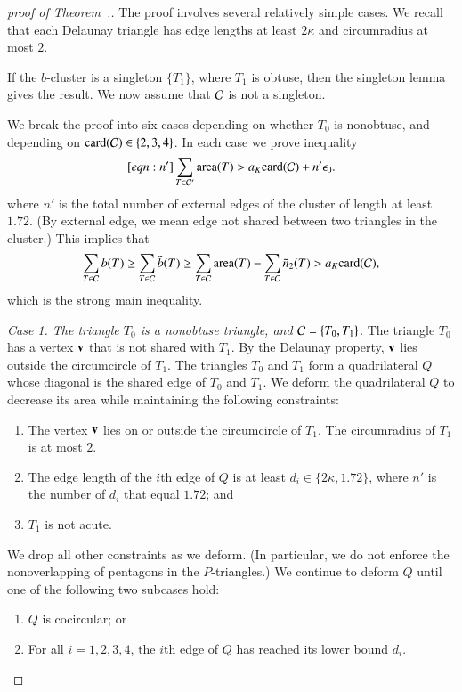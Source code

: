 \begin{proof}[proof of Theorem~.]
  The proof involves several relatively simple cases.  
  We recall that each Delaunay triangle has edge lengths at
  least $2\kappa$ and circumradius at most $2$.

  If the $b$-cluster is a singleton $\{T_1\}$, where $T_1$ is obtuse,
  then the singleton lemma gives the result.
  We now assume that $\mathcal C$ is not a singleton.


We break the proof into six cases depending on whether $T_0$ is
nonobtuse, and depending on ${\operatorname{card}}(\mathcal C)\in \{2,3,4\}$.
In each case we prove inequality 
\begin{equation}\libel{eqn:n'}
\sum_{T\in \C'} \area(T) > a_K \card(\C) + n'\epso.
\end{equation}
where $n'$ is the total number of external edges of the cluster of length at least $1.72$.
(By external edge, we mean edge not shared between two triangles in the cluster.)
This implies that
\[
\sum_{T\in\mathcal C} b(T) \ge \sum_{T\in\mathcal C} \tilde b(T) \ge \sum_{T\in\mathcal C}{\operatorname{area}}(T) - \sum_{T\in\mathcal C} \tilde n_2(T) > a_K {\operatorname{card}}(\mathcal C),
\]
which is the strong main inequality.

{\it Case 1. The triangle $T_0$ is a nonobtuse triangle, and
  $\mathcal C=\{T_0,T_1\}$.}  The triangle $T_0$ has a vertex ${\mathbf v}$ that is
not shared with $T_1$.  By the Delaunay property, ${\mathbf v}$ lies outside
the circumcircle of $T_1$.  The triangles $T_0$ and $T_1$ form a
quadrilateral $Q$ whose diagonal is the shared edge of $T_0$ and
$T_1$.  We deform the quadrilateral $Q$ to decrease its area while
maintaining the following constraints:
\begin{enumerate}
\item The vertex ${\mathbf v}$ lies on or outside the circumcircle of
  $T_1$. The circumradius of $T_1$ is at most $2$.
\item The edge length of the $i$th edge of $Q$ is at least
  $d_i\in\{2\kappa,1.72\}$,
where $n'$ is the number of $d_i$ that equal $1.72$; and
\item $T_1$ is not acute.
\end{enumerate}
We drop all other constraints as we deform. (In particular, we do not
enforce the nonoverlapping of pentagons in the $P$-triangles.)
We continue to deform $Q$ until one of the following two subcases hold:
\begin{enumerate}
\item $Q$ is cocircular; or
\item For all $i=1,2,3,4$, the $i$th edge of $Q$ has reached its lower
  bound $d_i$.
\end{enumerate}


\end{proof}
